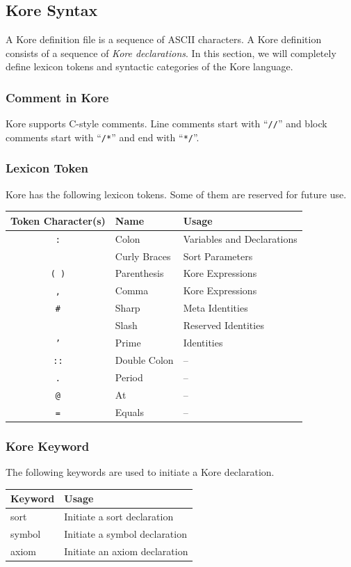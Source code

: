 \documentclass[UTF8,11pt]{article}
\theoremstyle{plain}
\theoremstyle{definition}
\theoremstyle{remark}
\newcommand{\sharpsymbol}{\#}
\newcommand{\slashsymbol}{\symbol{92}}
\begin{document}
\subsection{Kore Syntax}

A Kore definition file is a sequence of ASCII characters.
A Kore definition consists of a sequence of \emph{Kore declarations}.
In this section, we will completely define lexicon tokens and syntactic 
categories of the 
Kore language.

\subsubsection{Comment in Kore}
Kore supports C-style comments.
Line comments start with ``\verb|//|'' and block comments start with 
``\verb|/*|'' and end with ``\verb|*/|''.

\subsubsection{Lexicon Token}
Kore has the following lexicon tokens.
Some of them are reserved for future use.
\begin{center}
	\begin{tabular}{c|l|l}
		\textrm{Token Character(s)} & \textrm{Name} & \textrm{Usage}
		\\\hline
		\texttt{:} & Colon & Variables and Declarations
		\\
		\texttt{\string{ \string}} & Curly Braces & Sort Parameters
		\\
		\texttt{( )} & Parenthesis & Kore Expressions
		\\
		\texttt{,} & Comma & Kore Expressions
		\\
        \texttt{\sharpsymbol} & Sharp & Meta Identities
        \\
        \texttt{\slashsymbol} & Slash & Reserved Identities
        \\
        \texttt{'} & Prime & Identities
        \\
        \texttt{::} & Double Colon & --
        \\
		\texttt{.} & Period & --
		\\
		\texttt{@} & At & --
		\\
		\texttt{=} & Equals & --
	\end{tabular}
\end{center}

\subsubsection{Kore Keyword} 
The following keywords are used to initiate a Kore declaration.
\begin{center}
	{\ttfamily
		\begin{tabular}{l|l}
			\textrm{Keyword} & \textrm{Usage}
			\\\hline
			sort & \textrm{Initiate a sort declaration}
			\\
			symbol & \textrm{Initiate a symbol declaration}
			\\
			axiom & \textrm{Initiate an axiom declaration}
	\end{tabular}}
\end{center}
\end{document}
